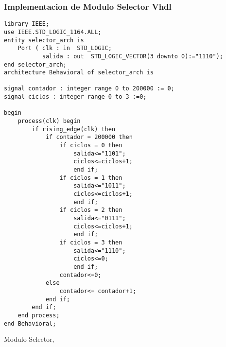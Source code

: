 \documentclass[a4paper]{article}
\begin{document}
\subsubsection{Implementacion de Modulo Selector Vhdl}
\begin{listing}[H]
	\begin{verbatim}
library IEEE;
use IEEE.STD_LOGIC_1164.ALL;
entity selector_arch is
    Port ( clk : in  STD_LOGIC;
           salida : out  STD_LOGIC_VECTOR(3 downto 0):="1110");
end selector_arch;
architecture Behavioral of selector_arch is

signal contador : integer range 0 to 200000 := 0;
signal ciclos : integer range 0 to 3 :=0;

begin
	process(clk) begin
		if rising_edge(clk) then
			if contador = 200000 then
				if ciclos = 0 then
					salida<="1101";
					ciclos<=ciclos+1;
					end if;
				if ciclos = 1 then
					salida<="1011";
					ciclos<=ciclos+1;
					end if;
				if ciclos = 2 then
					salida<="0111";
					ciclos<=ciclos+1;
					end if;
				if ciclos = 3 then
					salida<="1110";
					ciclos<=0;
					end if;
				contador<=0;
			else
				contador<= contador+1;
			end if;
		end if;
	end process;
end Behavioral;
\end{verbatim}
\caption{Modulo Selector,}
    \label{selector}
\end{listing}
\end{document}
